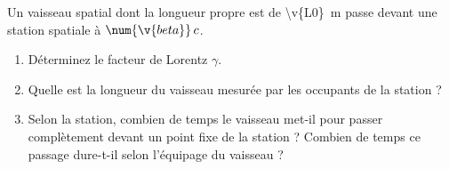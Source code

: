 Un vaisseau spatial dont la longueur propre est de \qty{\v{L0}}{m} passe devant une station spatiale à $\num{\v{beta}}\,c$.

\begin{enumerate}[label=\alph*)]
    \item Déterminez le facteur de Lorentz $\gamma$.
    \item Quelle est la longueur du vaisseau mesurée par les occupants de la station ?
    \item Selon la station, combien de temps le vaisseau met-il pour passer complètement devant un point fixe de la station ? Combien de temps ce passage dure-t-il selon l'équipage du vaisseau ?
\end{enumerate}
